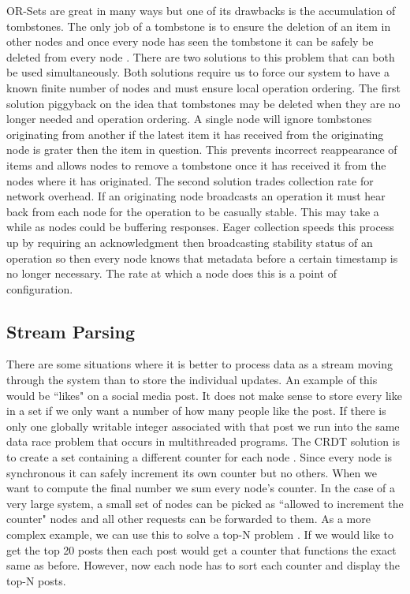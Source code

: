 \documentclass{article}
\begin{document}
\begin{multicols}{2}
\begin{refsection}
OR-Sets are great in many ways but one of its drawbacks is the accumulation of tombstones. The only job of a tombstone is to ensure the deletion of an item in other nodes and once every node has seen the tombstone it can be safely be deleted from every node \cite{bauwens_memory_2019}. There are two solutions to this problem that can both be used simultaneously. Both solutions require us to force our system to have a known finite number of nodes and must ensure local operation ordering. The first solution piggyback on the idea that tombstones may be deleted when they are no longer needed and operation ordering. A single node will ignore tombstones originating from another if the latest item it has received from the originating node is grater then the item in question. This prevents incorrect reappearance of items and allows nodes to remove a tombstone once it has received it from the nodes where it has originated. The second solution trades collection rate for network overhead. If an originating node broadcasts an operation it must hear back from each node for the operation to be casually stable. This may take a while as nodes could be buffering responses. Eager collection speeds this process up by requiring an acknowledgment then broadcasting stability status of an operation so then every node knows that metadata before a certain timestamp is no longer necessary. The rate at which a node does this is a point of configuration.

\subsection*{Stream Parsing}

There are some situations where it is better to process data as a stream moving through the system than to store the individual updates. An example of this would be ``likes" on a social media post. It does not make sense to store every like in a set if we only want a number of how many people like the post. If there is only one globally writable integer associated with that post we run into the same data race problem that occurs in multithreaded programs. The CRDT solution is to create a set containing a different counter for each node \cite{navalho_incremental_2013}. Since every node is synchronous it can safely increment its own counter but no others. When we want to compute the final number we sum every node's counter. In the case of a very large system, a small set of nodes can be picked as ``allowed to increment the counter" nodes and all other requests can be forwarded to them. As a more complex example, we can use this to solve a top-N problem \cite{navalho_incremental_2013}. If we would like to get the top 20 posts then each post would get a counter that functions the exact same as before. However, now each node has to sort each counter and display the top-N posts.


\end{refsection}
\end{multicols}
\end{document}
